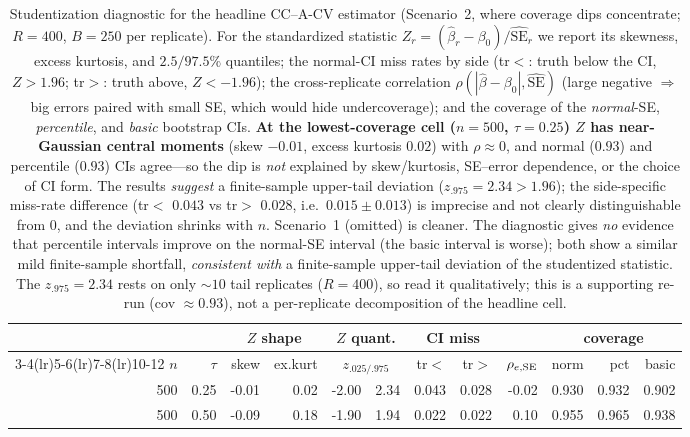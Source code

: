 \begin{table}[t]\centering\small
\caption{Studentization diagnostic for the headline CC--A-CV estimator (Scenario~2, where coverage dips concentrate; $R=400$, $B=250$ per replicate). For the standardized statistic $Z_r=(\widehat\beta_r-\beta_0)/\widehat{\mathrm{SE}}_r$ we report its skewness, excess kurtosis, and $2.5/97.5\%$ quantiles; the normal-CI miss rates by side (tr$<$: truth below the CI, $Z>1.96$; tr$>$: truth above, $Z<-1.96$); the cross-replicate correlation $\rho(|\widehat\beta-\beta_0|,\widehat{\mathrm{SE}})$ (large negative $\Rightarrow$ big errors paired with small SE, which would hide undercoverage); and the coverage of the \emph{normal}-SE, \emph{percentile}, and \emph{basic} bootstrap CIs. \textbf{At the lowest-coverage cell ($n{=}500$, $\tau{=}0.25$) $Z$ has near-Gaussian central moments} (skew $-0.01$, excess kurtosis $0.02$) with $\rho\approx0$, and normal ($0.93$) and percentile ($0.93$) CIs agree---so the dip is \emph{not} explained by skew/kurtosis, SE--error dependence, or the choice of CI form. The results \emph{suggest} a finite-sample upper-tail deviation ($z_{.975}{=}2.34>1.96$); the side-specific miss-rate difference (tr$<$ $0.043$ vs tr$>$ $0.028$, i.e.\ $0.015\pm0.013$) is imprecise and not clearly distinguishable from $0$, and the deviation shrinks with $n$. Scenario~1 (omitted) is cleaner. The diagnostic gives \emph{no} evidence that percentile intervals improve on the normal-SE interval (the basic interval is worse); both show a similar mild finite-sample shortfall, \emph{consistent with} a finite-sample upper-tail deviation of the studentized statistic. The $z_{.975}{=}2.34$ rests on only $\sim10$ tail replicates ($R{=}400$), so read it qualitatively; this is a supporting re-run (cov $\approx0.93$), not a per-replicate decomposition of the headline cell.}
\label{tab:studentized}\begin{tabular}{rr rr r@{,}l rr r rrr}\toprule
&&\multicolumn{2}{c}{$Z$ shape}&\multicolumn{2}{c}{$Z$ quant.}&\multicolumn{2}{c}{CI miss}&&\multicolumn{3}{c}{coverage}\\
\cmidrule(lr){3-4}\cmidrule(lr){5-6}\cmidrule(lr){7-8}\cmidrule(lr){10-12}
$n$&$\tau$&skew&ex.kurt&\multicolumn{2}{c}{$z_{.025/.975}$}&tr$<$&tr$>$&$\rho_{e,\rm SE}$&norm&pct&basic\\\midrule
500 & 0.25 & -0.01 & 0.02 & -2.00 & 2.34 & 0.043 & 0.028 & -0.02 & 0.930 & 0.932 & 0.902 \\
500 & 0.50 & -0.09 & 0.18 & -1.90 & 1.94 & 0.022 & 0.022 & 0.10 & 0.955 & 0.965 & 0.938 \\

\end{tabular}
\end{table}
